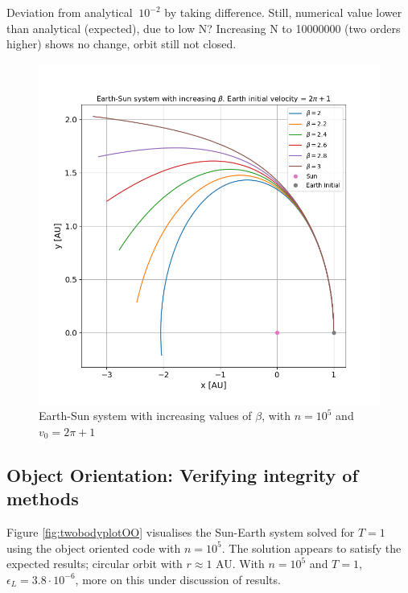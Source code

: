 \documentclass[%
oneside,                 %
final,                   %
10pt]{article}
\begin{document}
Deviation from analytical $~10^{-2}$ by taking difference.
Still, numerical value lower than analytical (expected), due to low N? Increasing N to 10000000 (two orders higher) shows no change,
orbit still not closed.
\begin{figure}[!htb]
        \centering 
         \includegraphics[scale=.5]{../Results/vesc6betas.png} 
        \caption{Earth-Sun system with increasing values of $\beta$, with $n=10^5$ and $v_0=2\pi +1$}
        \label{fig:vesc6betas}   
\end{figure}  

\subsection{Object Orientation: Verifying integrity of methods} 
\label{subsec:OOverification}
Figure \ref{fig:twobodyplotOO} visualises the Sun-Earth system solved for $T=1$ using the object oriented code with $n=10^5$. The solution appears to satisfy the expected results; circular orbit with $r\approx 1$ AU. With $n=10^5$ and $T=1$, $\epsilon_L=3.8 \cdot 10^{-6}$, more on this under discussion of results.
\end{document}

